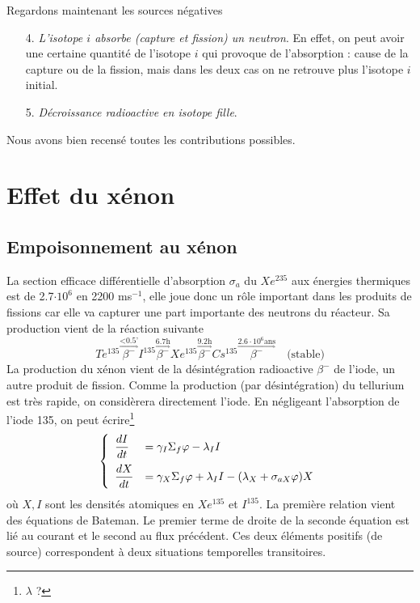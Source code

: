 		Regardons maintenant les sources négatives
		\begin{itemize}
		\item[4.] \textit{L'isotope $i$ absorbe (capture et fission) un neutron}. En effet, on peut 
		avoir une certaine quantité de l'isotope $i$ qui provoque de l'absorption : cause de la 
		capture ou de la fission, mais dans les deux cas on ne retrouve plus l'isotope $i$ initial.
		\item[5.] \textit{Décroissance radioactive en isotope fille}.
		\end{itemize}
		Nous avons bien recensé toutes les contributions possibles.
		
\section{Effet du xénon}
	\subsection{Empoisonnement au xénon}
	La section efficace différentielle d'absorption $\sigma_a$ du $Xe^{235}$ aux énergies thermiques
	est de 2.7$\cdot10^6$ en 2200 ms$^{-1}$, elle joue donc un rôle important dans les produits de 
	fissions car elle va capturer une part importante des neutrons du réacteur. Sa production vient de
	la réaction suivante
	\begin{equation}
	Te^{135} \overset{\underset{\Longrightarrow}{\text{<0.5'}}}{\beta^-} I^{135} 
	\overset{\underset{\Longrightarrow}{\text{6.7h}}}{\beta^-} Xe^{135} 
	\overset{\underset{\Longrightarrow}{\text{9.2h}}}{\beta^-} Cs^{135} 
	\overset{\underset{\Longrightarrow}{2.6\cdot 10^6\text{ans}}}{\beta^-}\quad \text{(stable)}	
	\end{equation}
	La production du xénon vient de la désintégration radioactive $\beta^-$ de l'iode, un autre 
	produit de fission. Comme la production (par désintégration) du tellurium est très rapide, on 
	considèrera directement l'iode. En négligeant l'absorption de l'iode 135, on peut 
	écrire\footnote{$\lambda$ ? }
	\begin{equation}
	\left\{\begin{array}{ll}
	\dfrac{{dI}}{{dt}} &\DS= {\gamma _I}{\Sigma _f}\varphi  - {\lambda _I}I\vspace{2mm}\\
	\dfrac{{dX}}{{dt}} &\DS= {\gamma _X}{\Sigma _f}\varphi  + {\lambda _I}I - ({\lambda _X} + {\sigma
	 _{aX}}\varphi )X
	\end{array}\right.
	\end{equation}	
	où $X, I$ sont les densités atomiques en $Xe^{135}$ et $I^{135}$. La première relation vient 
	des équations de Bateman. Le premier terme de droite de la seconde équation est lié au courant 
	et le second au flux précédent. Ces deux éléments positifs (de source) correspondent à deux 
	situations temporelles transitoires.\\
	
